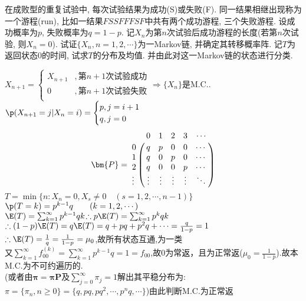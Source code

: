 \begin{problem}{3.12}
在成败型的重复试验中, 每次试验结果为成功(S)或失败(F). 同一结果相继出现称为一个游程(run), 比如一结果$FSSFFFSF$中共有两个成功游程, 三个失败游程. 设成功概率为$p$, 失败概率为$q = 1 - p$. 记$X_n$为第$n$次试验后成功游程的长度(若第$n$次试验, 则$X_n = 0$). 试证$\{X_n, n = 1,2,\cdots\}$为一Markov链, 并确定其转移概率阵. 记$T$为返回状态$0$的时间, 试求$T$的分布及均值. 并由此对这一Markov链的状态进行分类.
\end{problem}
\begin{solution}
	$X_{n+1} =
		\begin{cases}
			X_{n+1} & , \text{第$n+1$次试验成功} \\
			0       & , \text{第$n+1$次试验失败} \\
		\end{cases}\Rightarrow \{X_n\}\text{是M.C.}$.
	$\p(X_{n+1} = j | X_n = i) =
		\begin{cases}
			p, j = i + 1 \\
			q, j = 0
		\end{cases}$
	\[\bm{P} =
		\bordermatrix{
			~ & 0 & 1 & 2 & 3 & \cdots \cr
			0 & q & p & 0 & 0 & \cdots \cr
			1 & q & 0 & p & 0 & \cdots \cr
			2 & q & 0 & 0 & p & \cdots \cr
			\vdots & \vdots & \vdots & \vdots & \vdots & \ddots \cr}
	\]
	$T = \min \{n : X_n = 0, X_s \neq 0 \quad (s = 1,2,\cdots, n-1)\}$\\
	$\p(T = k) = p^{k-1} q \qquad (k=1,2,\cdots)$\\
	$\E(T) = \sum^{\infty}_{k=1}p^{k-1} qk$\quad $\therefore p\E(T) = \sum^{\infty}_{k=1}p^k qk$\\
	$\therefore (1-p)\E(T) = q\E(T) = q + pq + p^2 q + \cdots = \frac{q}{1-p} = 1$\\
	$\therefore \E(T) = \frac{1}{q} = \frac{1}{1-p} = \mu_0$,故所有状态互通,为一类
	\\ 又$\sum_{k=1}^{\infty}f_{00}^{(k)} = \sum_{k=1}^{\infty}p^{k-1}q = 1 = f_{00}$,故0为常返，且为正常返($\mu_0=\frac{1}{1-p}$).故本M.C.为不可约遍历的.
	\\ (或者由$\bm{\pi}=\bm{\pi}\bm{P}$及$\sum_{j=0}^{\infty}\pi _j=1$解出其平稳分布为:
	$\pi = \{\pi _n,n\geqslant 0\} = \{q,pq,pq^2,\cdots ,p^nq,\cdots \}$)由此判断M.C.为正常返
	\begin{figure}[H]
		\centering
\end{figure}
\end{solution}

